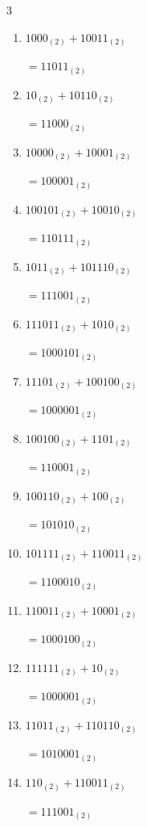 \begin{multicols}{3}
\begin{enumerate}
  \item $1000_{(2)} + 10011_{(2)}$

        $=11011_{(2)}$

  \item $10_{(2)} + 10110_{(2)}$

        $=11000_{(2)}$

  \item $10000_{(2)} + 10001_{(2)}$

        $=100001_{(2)}$

  \item $100101_{(2)} + 10010_{(2)}$

        $=110111_{(2)}$

  \item $1011_{(2)} + 101110_{(2)}$

        $=111001_{(2)}$

\columnbreak %

\resetques

  \item $111011_{(2)} + 1010_{(2)}$

        $=1000101_{(2)}$

  \item $11101_{(2)} + 100100_{(2)}$

        $=1000001_{(2)}$

  \item $100100_{(2)} + 1101_{(2)}$

        $=110001_{(2)}$

  \item $100110_{(2)} + 100_{(2)}$

        $=101010_{(2)}$

  \item $101111_{(2)} + 110011_{(2)}$

        $=1100010_{(2)}$

  \item $110011_{(2)} + 10001_{(2)}$

        $=1000100_{(2)}$

  \item $111111_{(2)} + 10_{(2)}$

        $=1000001_{(2)}$

  \item $11011_{(2)} + 110110_{(2)}$

        $=1010001_{(2)}$

  \item $110_{(2)} + 110011_{(2)}$

        $=111001_{(2)}$


\end{enumerate}
\end{multicols}
